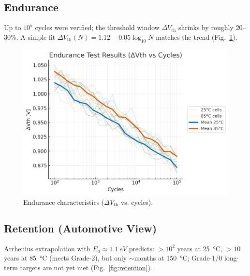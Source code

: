 \documentclass[conference]{IEEEtran}
\begin{document}
\subsection{Endurance}
Up to \(10^{5}\) cycles were verified; the threshold window \(\Delta V_{\mathrm{th}}\) shrinks by roughly 20–30\%.  
A simple fit \(\Delta V_{\mathrm{th}}(N)=1.12-0.05\log_{10}N\) matches the trend (Fig.~\ref{fig:endurance}).

\begin{figure}[t]
  \centering
  \includegraphics[width=\linewidth]{figures/fig5_endurance.png}
  \caption{Endurance characteristics (\(\Delta V_{\mathrm{th}}\) vs. cycles).}
  \label{fig:endurance}
\end{figure}

\subsection{Retention (Automotive View)}
Arrhenius extrapolation with \(E_a\approx\SI{1.1}{eV}\) predicts:
\(>\!10^{2}\) years at \SI{25}{\celsius}, \(>\!10\) years at \SI{85}{\celsius} (meets Grade-2), but only \(\sim\)months at \SI{150}{\celsius}; Grade-1/0 long-term targets are not yet met (Fig.~\ref{fig:retention}).
\end{document}
